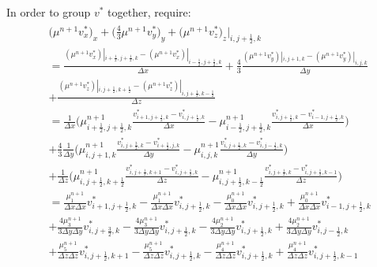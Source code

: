 \documentclass{article}
\numberwithin{equation}{subsection}
\begin{document}
In order to group $v^*$ together, require:
\begin{align}
\begin{split}
& \Big(\mu^{n+1} v^*_x\Big)_x + \Big(\frac{4}{3}\mu^{n+1} v^*_y \Big)_y  + \Big(\mu^{n+1} v^*_z\Big)_z |_{i,j+\frac{1}{2},k} \\
& =  \frac{(\mu^{n+1} v_x^*)|_{i+\frac{1}{2},j+\frac{1}{2},k} - (\mu^{n+1} v^*_x)|_{i-\frac{1}{2},j+\frac{1}{2},k}}{\Delta x} + \frac{4}{3} \frac{(\mu^{n+1} v^*_y)|_{i,j+1,k} - (\mu^{n+1} v^*_y)|_{i,j,k}}{\Delta y} \\
& + \frac{(\mu^{n+1}v^*_z)|_{i,j+\frac{1}{2},k+\frac{1}{2}} - (\mu^{n+1} v^*_{z})|_{i,j+\frac{1}{2},k-\frac{1}{2}}}{\Delta z}\\
& = \frac{1}{\Delta x} \Big( \mu^{n+1}_{i+\frac{1}{2},j+\frac{1}{2},k} \frac{v^*_{i+1,j+\frac{1}{2},k} - v^*_{i,j+\frac{1}{2},k}}{\Delta x} - \mu^{n+1}_{i-\frac{1}{2},j+\frac{1}{2},k}\frac{v^*_{i,j+\frac{1}{2},k} - v^*_{i-1,j+\frac{1}{2},k}}{\Delta x} \Big) \\
& +\frac{4}{3} \frac{1}{\Delta y} \Big( \mu^{n+1}_{i,j+1,k} \frac{v^*_{i,j+\frac{3}{2},k} - v^*_{i+\frac{1}{2},j,k}}{\Delta y} - \mu^{n+1}_{i,j,k} \frac{v^*_{i,j+\frac{1}{2},k}-v^*_{i,j-\frac{1}{2},k}}{\Delta y} \Big) \\ 
& + \frac{1}{\Delta z} \Big( \mu^{n+1}_{i,j+\frac{1}{2},k+\frac{1}{2}}\frac{v^*_{i,j+\frac{1}{2},k+1} - v^*_{i,j+\frac{1}{2},k}}{\Delta z} - \mu^{n+1}_{i,j+\frac{1}{2},k-\frac{1}{2}}\frac{v^*_{i,j+\frac{1}{2},k} - v^*_{i,j+\frac{1}{2},k-1}}{\Delta z} \Big)\\
& = \frac{\mu^{n+1}_1}{\Delta x \Delta x} v^*_{i+1,j+\frac{1}{2},k} - \frac{\mu^{n+1}_1}{\Delta x \Delta x}v^*_{i,j+\frac{1}{2},k} - \frac{\mu^{n+1}_0}{\Delta x \Delta x}v^*_{i,j+\frac{1}{2},k} + \frac{\mu^{n+1}_0}{\Delta x \Delta x}v^*_{i-1,j+\frac{1}{2},k}\\
& + \frac{4\mu^{n+1}_3}{3\Delta y \Delta y}v^*_{i,j+\frac{3}{2},k} -\frac{4\mu^{n+1}_3}{3\Delta y \Delta y}v^*_{i,j+\frac{1}{2},k} -\frac{4\mu^{n+1}_2}{3\Delta y \Delta y}v^*_{i,j+\frac{1}{2},k} + \frac{4\mu^{n+1}_2}{3\Delta y \Delta y}v^*_{i,j-\frac{1}{2},k} \\
& + \frac{\mu^{n+1}_5}{\Delta z \Delta z}v^*_{i,j+\frac{1}{2},k+1} - \frac{\mu^{n+1}_5}{\Delta z \Delta z}v^*_{i,j+\frac{1}{2},k} - \frac{\mu^{n+1}_4}{\Delta z \Delta z}v^*_{i,j+\frac{1}{2},k} + \frac{\mu^{n+1}_4}{\Delta z \Delta z}v^*_{i,j+\frac{1}{2},k-1}
\end{split}
\end{align}
\end{document}
